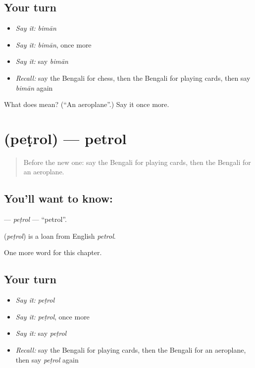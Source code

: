 \subsection*{Your turn}
\begin{itemize}
\raggedright
  \item \emph{Say it:} \emph{bimān}
  \item \emph{Say it:} \emph{bimān}, once more
  \item \emph{Say it:} say \emph{bimān}
  \item \emph{Recall:} say the Bengali for chess, then the Bengali for playing cards, then say \emph{bimān} again
\end{itemize}

\begin{tcolorbox}[breakable,colback=teal!4,colframe=teal!35!black,title={Before you move on}]
What does  mean? (\textquotedblleft{}An aeroplane\textquotedblright{}.) Say it once more.
\end{tcolorbox}
\section[\texorpdfstring{\bn{পেট্রোল} (peṭrol)}{পেট্রোল (peṭrol)}]{ (peṭrol) — petrol}

\label{lesson:BN-C198-petrol}



\begin{quote}
Before the new one: say the Bengali for playing cards, then the Bengali for an aeroplane.
\end{quote}

\subsection*{You'll want to know: }
\textbf{} — \emph{peṭrol} — \textquotedblleft{}petrol\textquotedblright{}.

\begin{cousinweb}
\textbf{} (\emph{peṭrol}) is a loan from English \emph{petrol}.
\end{cousinweb}

\begin{grammarlens}[title={What you've built}]
One more word for this chapter.
\end{grammarlens}

\subsection*{Your turn}
\begin{itemize}
\raggedright
  \item \emph{Say it:} \emph{peṭrol}
  \item \emph{Say it:} \emph{peṭrol}, once more
  \item \emph{Say it:} say \emph{peṭrol}
  \item \emph{Recall:} say the Bengali for playing cards, then the Bengali for an aeroplane, then say \emph{peṭrol} again
\end{itemize}

